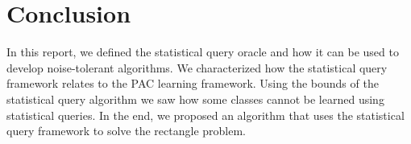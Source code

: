 \section{Conclusion}
\label{sec:conclusion}
In this report, we defined the statistical query oracle and how it can be used to develop noise-tolerant algorithms. We characterized how the statistical query framework relates to the PAC learning framework. Using the bounds of the statistical query algorithm we saw how some classes cannot be learned using statistical queries. In the end, we proposed an algorithm that uses the statistical query framework to solve the rectangle problem.
